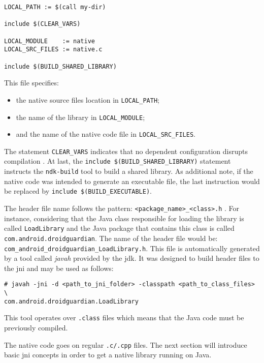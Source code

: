 \begin{lstlisting}[caption=The minimum set of instructions in the \texttt{Android.mk} file]
LOCAL_PATH := $(call my-dir)
 
include $(CLEAR_VARS)
       
LOCAL_MODULE    := native
LOCAL_SRC_FILES := native.c

include $(BUILD_SHARED_LIBRARY)
\end{lstlisting}

This file specifies:
\begin{itemize}
\item  the native source files location in \texttt{LOCAL\_PATH};
\item  the name of the library in \texttt{LOCAL\_MODULE};
\item  and the name of the native code file in \texttt{LOCAL\_SRC\_FILES}.
\end{itemize}

The statement \texttt{CLEAR\_VARS} indicates that no dependent configuration disrupts compilation \cite{AndroidNDK:Packt}. At last, the \texttt{include \$(BUILD\_SHARED\_LIBRARY)} statement instructs the \texttt{ndk-build} tool to build a shared library. As additional note, if the native code was intended to generate an executable file, the last instruction would be replaced by \texttt{include \$(BUILD\_EXECUTABLE)}.

The header file name follows the pattern: \texttt{<package\_name>\_<class>.h} . For instance, considering that the Java class responsible for loading the library is called \texttt{LoadLibrary} and the Java package that contains this class is called \texttt{com.android.droidguardian}. The name of the header file would be: \texttt{com\_android\_droidguardian\_LoadLibrary.h}. This file is automatically generated by a tool called \textit{javah} provided by the \gls{jdk}. It was designed to build header files to the \gls{jni} and may be used as follows:

\begin{lstlisting}[caption=Example of use of the javah tool]
# javah -jni -d <path_to_jni_folder> -classpath <path_to_class_files> \
com.android.droidguardian.LoadLibrary
\end{lstlisting}

This tool operates over \texttt{.class} files which means that the Java code must be previously compiled.

The native code goes on regular \texttt{.c/.cpp} files. The next section will introduce basic \gls{jni} concepts in order to get a native library running on Java.

